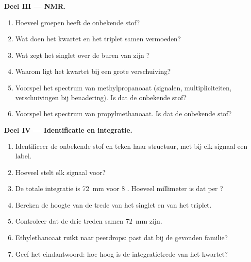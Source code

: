 \begin{problem}
\medskip
\noindent\textbf{Deel III --- NMR.}
\begin{enumerate}[resume]
  \item Hoeveel groepen  heeft de onbekende stof?
  \item Wat doen het kwartet en het triplet samen vermoeden?
  \item Wat zegt het singlet over de buren van zijn ?
  \item Waarom ligt het kwartet bij een grote verschuiving?
  \item Voorspel het spectrum van methylpropanoaat
         (signalen, multipliciteiten, verschuivingen
        bij benadering). Is dat de onbekende stof?
  \item Voorspel het spectrum van propylmethanoaat. Is dat de onbekende
        stof?
\end{enumerate}

\medskip
\noindent\textbf{Deel IV --- Identificatie en integratie.}
\begin{enumerate}[resume]
  \item Identificeer de onbekende stof en teken haar structuur, met bij
        elk signaal een label.
  \item Hoeveel  stelt elk signaal voor?
  \item De totale integratie is \qty{72}{mm} voor 8 . Hoeveel
        millimeter is dat per ?
  \item Bereken de hoogte van de trede van het singlet en van het
        triplet.
  \item Controleer dat de drie treden samen \qty{72}{mm} zijn.
  \item Ethylethanoaat ruikt naar peerdrops: past dat bij de gevonden
        familie?
  \item Geef het eindantwoord: hoe hoog is de integratietrede van het
        kwartet?
\end{enumerate}
\end{problem}

